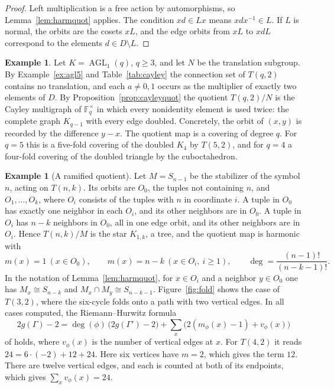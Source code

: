 \documentclass[12pt,letterpaper]{article}
\numberwithin{equation}{section}
\theoremstyle{definition}
\newtheorem{example}[theorem]{Example}
\DeclareMathOperator{\agll}{AGL}
\begin{document}
\begin{proof}
Left multiplication is a free action by automorphisms, so Lemma~\ref{lem:harmquot} applies. The condition $xd\in Lx$ means $xdx^{-1}\in L$. If $L$ is normal, the orbits are the cosets $xL$, and the edge orbits from $xL$ to $xdL$ correspond to the elements $d\in D\setminus L$.
\end{proof}
\begin{example}\label{ex:translation}
Let $K=\agll_1(q)$, $q\geq3$, and let $N$ be the translation subgroup. By Example~\ref{ex:agl5} and Table~\ref{tab:cayley} the connection set of $T(q,2)$ contains no translation, and each $a\neq0,1$ occurs as the multiplier of exactly two elements of $D$. By Proposition~\ref{prop:cayleyquot} the quotient $T(q,2)/N$ is the Cayley multigraph of $\mathbb F_q^\times$ in which every nonidentity element is used twice: the complete graph $K_{q-1}$ with every edge doubled. Concretely, the orbit of $(x,y)$ is recorded by the difference $y-x$. The quotient map is a covering of degree $q$. For $q=5$ this is a five-fold covering of the doubled $K_4$ by $T(5,2)$, and for $q=4$ a four-fold covering of the doubled triangle by the cuboctahedron.
\end{example}
\begin{example}[A ramified quotient]\label{ex:star}
Let $M=S_{n-1}$ be the stabilizer of the symbol $n$, acting on $T(n,k)$. Its orbits are $O_0$, the tuples not containing $n$, and $O_1,\ldots,O_k$, where $O_i$ consists of the tuples with $n$ in coordinate $i$. A tuple in $O_0$ has exactly one neighbor in each $O_i$, and its other neighbors are in $O_0$. A tuple in $O_i$ has $n-k$ neighbors in $O_0$, all in one edge orbit, and its other neighbors are in $O_i$. Hence $T(n,k)/M$ is the star $K_{1,k}$, a tree, and the quotient map is harmonic with
\[
m(x)=1\ (x\in O_0),\qquad m(x)=n-k\ (x\in O_i,\ i\geq1),\qquad \deg=\frac{(n-1)!}{(n-k-1)!}.
\]
In the notation of Lemma~\ref{lem:harmquot}, for $x\in O_i$ and a neighbor $y\in O_0$ one has $M_x\cong S_{n-k}$ and $M_x\cap M_y\cong S_{n-k-1}$. Figure~\ref{fig:fold} shows the case of $T(3,2)$, where the six-cycle folds onto a path with two vertical edges. In all cases computed, the Riemann--Hurwitz formula
\[
2g(\Gamma)-2=\deg(\phi)\,\bigl(2g(\Gamma')-2\bigr)+\sum_{x}\bigl(2(m_\phi(x)-1)+v_\phi(x)\bigr)
\]
of \cite{BN09} holds, where $v_\phi(x)$ is the number of vertical edges at $x$. For $T(4,2)$ it reads $24=6\cdot(-2)+12+24$. Here six vertices have $m=2$, which gives the term $12$. There are twelve vertical edges, and each is counted at both of its endpoints, which gives $\sum_xv_\phi(x)=24$.
\end{example}
\end{document}
